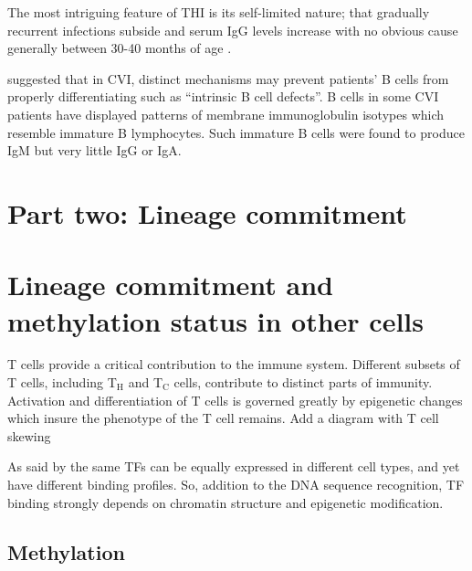 \documentclass[12pt]{article}
\newcommand{\Th}{T$_\textrm{H}$ }
\newcommand{\Tc}{T$_\textrm{C}$ }
\begin{document}
			The most intriguing feature of THI is its self-limited nature; that gradually recurrent infections subside and serum IgG levels increase with no obvious cause generally between 30-40 months of age \citep{Tiller78,Soothill68,Siegel81,McGeady87,Dressler89,Kowalczyk97,Dalal98}. 
			
			\citet{Fiorilli86} suggested that in CVI, distinct mechanisms may prevent patients' B cells from properly differentiating such as ``intrinsic B cell defects''. 
			B cells in some CVI patients have displayed patterns of membrane immunoglobulin isotypes which resemble immature B lymphocytes. 
			Such immature B cells were found to produce IgM but very little IgG or IgA. 
			
			
		\section{Part two: Lineage commitment}
			
			
			
			
	

	

	\section{Lineage commitment and methylation status in other cells}
	
		T cells provide a critical contribution to the immune system. 
		Different subsets of T cells, including \Th and \Tc cells, contribute to distinct parts of immunity.
		Activation and differentiation of T cells is governed greatly by epigenetic changes which insure the phenotype of the T cell remains.
		{\Huge Add a diagram with T cell skewing}

	
	As said by \citet{Choukrallah14} the same TFs can be equally expressed in different cell types, and yet have different binding profiles. So, addition to the DNA sequence recognition, TF binding strongly depends on chromatin structure and epigenetic modification.
	
	\subsection{Methylation}
	
\end{document}
